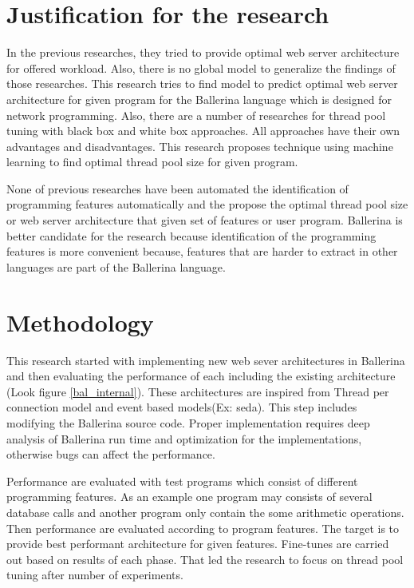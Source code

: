 

\section{Justification for the research}

 In the previous researches, they tried to provide optimal web server architecture for offered workload. Also, there is no global model to generalize the findings of those researches. This research tries to find model to predict optimal web server architecture for given program for the Ballerina language which is designed for network programming.  Also, there are a number of researches for thread pool tuning with black box and white box approaches. All approaches have their own advantages and disadvantages. This research proposes technique using machine learning to find optimal thread pool size for given program.  
 
 None of previous researches have been automated the identification of programming features automatically and the propose the optimal thread pool size or web server architecture that given set of features or user program. Ballerina is better candidate for the research because identification of the programming features is more convenient because, features that are harder to extract in other languages are part of the Ballerina language.  


\section{Methodology}

	This research started with implementing new web sever architectures in Ballerina and then evaluating the performance of each including the existing architecture (Look figure \ref{bal_internal}). These architectures are inspired from Thread per connection model and event based models(Ex: \acrshort{seda}). This step includes modifying the Ballerina source code. Proper implementation requires deep analysis of Ballerina run time and optimization for the implementations, otherwise bugs can affect the performance. 
	
	Performance are evaluated with test programs which consist of different programming features. As an example one program may consists of several database calls and another program only contain the some arithmetic operations. Then performance are evaluated according to program features. The target is to provide best performant architecture for given features. Fine-tunes are carried out based on results of each phase. That led the research to focus on thread pool tuning after number of experiments. 
	
